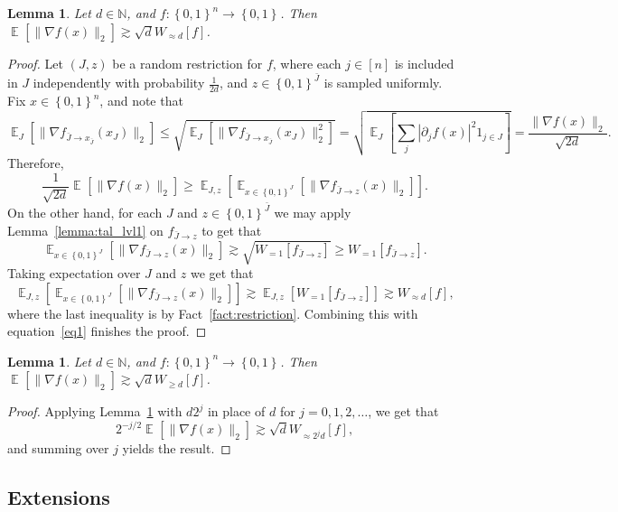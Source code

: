 \documentclass[10pt]{article}
\newcommand{\card}[1]{\left\lvert #1\right\rvert}
\newcommand{\set}[1]{{\left\{#1\right\}}}
\newcommand{\Expect}[2]{{\mathop{\mathbb E}_{#1}\left[#2\right]}}
\newcommand{\norm}[1]{\lVert #1\rVert}
\newcommand{\power}[1]{\set{0,1}^{#1}}
\renewcommand{\gg}{\gtrsim}
\newtheorem{lemma}[thm]{Lemma}
\begin{document}
\begin{lemma}\label{lemma:tal_lvld_exact}
  Let $d\in\mathbb{N}$, and $f\colon\power{n}\to\power{}$. Then
  $\Expect{}{\norm{\nabla f(x)}_2 }\gg \sqrt{d}W_{\approx d}[f]$.
\end{lemma}
\begin{proof}
  Let $(J,z)$ be a random restriction for $f$, where each $j\in[n]$ is included in $J$ independently with probability
  $\frac{1}{2d}$, and $z\in\power{\bar{J}}$ is sampled uniformly. Fix $x\in \power{n}$, and note that
  \[
    \Expect{J}{\norm{\nabla f_{\bar{J}\rightarrow x_{\bar{J}}}(x_J)}_2}
    \leq \sqrt{\Expect{J}{\norm{\nabla f_{\bar{J}\rightarrow x_{\bar{J}}}(x_J)}^2_2}}
    =\sqrt{\Expect{J}{\sum\limits_{j}{\card{\partial_j f(x)}^2 1_{j\in J}}}}
    =\frac{\norm{\nabla f(x)}_2}{\sqrt{2d}}.
  \]
  Therefore,
  \begin{equation}\label{eq1}
  \frac{1}{\sqrt{2d}}\Expect{}{\norm{\nabla f(x)}_2}\geq \Expect{J,z}{\Expect{x\in\power{J}}{\norm{\nabla f_{\bar{J}\rightarrow z}(x)}_2}}.
  \end{equation}
  On the other hand, for each $J$ and $z\in\power{\bar{J}}$ we may apply Lemma~\ref{lemma:tal_lvl1} on $f_{\bar{J}\rightarrow z}$ to get that
  \[
  \Expect{x\in\power{J}}{\norm{\nabla f_{\bar{J}\rightarrow z}(x)}_2}\gg \sqrt{W_{=1}[f_{\bar{J}\rightarrow z}]}\geq W_{=1}[f_{\bar{J}\rightarrow z}].
  \]
  Taking expectation over $J$ and $z$ we get that
  \[
  \Expect{J,z}{\Expect{x\in\power{J}}{\norm{\nabla f_{\bar{J}\rightarrow z}(x)}_2}}
  \gg \Expect{J,z}{W_{=1}[f_{\bar{J}\rightarrow z}]}
  \gg W_{\approx d}[f],
  \]
  where the last inequality is by Fact~\ref{fact:restriction}. Combining this with equation~\eqref{eq1} finishes the proof.
\end{proof}


\begin{lemma}\label{lemma:tal_lvld_above}
  Let $d\in\mathbb{N}$, and $f\colon\power{n}\to\power{}$. Then
  $\Expect{}{\norm{\nabla f(x)}_2 }\gg \sqrt{d}W_{\geq d}[f]$.
\end{lemma}
\begin{proof}
  Applying Lemma~\ref{lemma:tal_lvld_exact} with $d 2^{j}$ in place of $d$ for $j=0,1,2,\ldots$, we get that
  \[
    2^{-j/2}\Expect{}{\norm{\nabla f(x)}_2 }
    \gg \sqrt{d}W_{\approx 2^{j} d}[f],
  \]
  and summing over $j$ yields the result.
\end{proof}
\setcounter{subsection}{2}\setcounter{thm}{5}
\subsection{Extensions}
\end{document}
